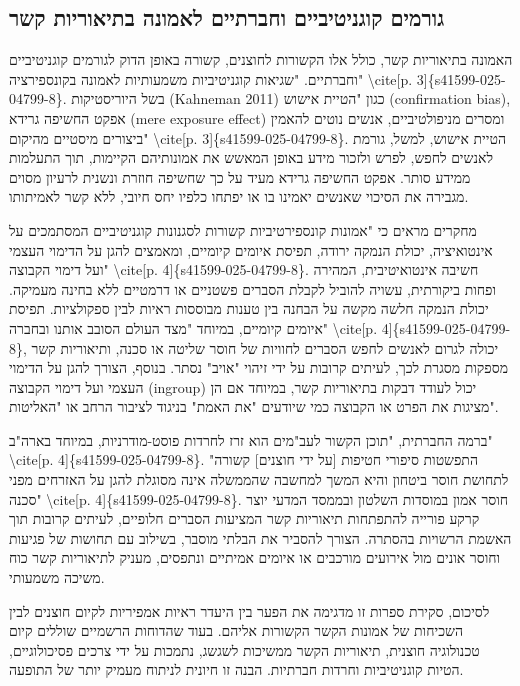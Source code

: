 \documentclass[12pt,a4paper]{article}
\begin{document}
\subsection{גורמים קוגניטיביים וחברתיים לאמונה בתיאוריות קשר}
האמונה בתיאוריות קשר, כולל אלו הקשורות לחוצנים, קשורה באופן הדוק לגורמים קוגניטיביים וחברתיים. "שגיאות קוגניטיביות משמעותיות לאמונה בקונספירציה" \textbackslash{}cite[p. 3]\{s41599-025-04799-8\}. בשל היוריסטיקות (Kahneman 2011) כגון "הטיית אישוש (confirmation bias), אפקט החשיפה גרידא (mere exposure effect) ומסרים מניפולטיביים, אנשים נוטים להאמין ביצורים מיסטיים מהיקום" \textbackslash{}cite[p. 3]\{s41599-025-04799-8\}. הטיית אישוש, למשל, גורמת לאנשים לחפש, לפרש ולזכור מידע באופן המאשש את אמונותיהם הקיימות, תוך התעלמות ממידע סותר. אפקט החשיפה גרידא מעיד על כך שחשיפה חוזרת ונשנית לרעיון מסוים מגבירה את הסיכוי שאנשים יאמינו בו או יפתחו כלפיו יחס חיובי, ללא קשר לאמיתותו.

מחקרים מראים כי "אמונות קונספירטיביות קשורות לסגנונות קוגניטיביים המסתמכים על אינטואיציה, יכולת הנמקה ירודה, תפיסת איומים קיומיים, ומאמצים להגן על הדימוי העצמי ועל דימוי הקבוצה" \textbackslash{}cite[p. 4]\{s41599-025-04799-8\}. חשיבה אינטואיטיבית, המהירה ופחות ביקורתית, עשויה להוביל לקבלת הסברים פשטניים או דרמטיים ללא בחינה מעמיקה. יכולת הנמקה חלשה מקשה על הבחנה בין טענות מבוססות ראיות לבין ספקולציות. תפיסת איומים קיומיים, במיוחד "מצד העולם הסובב אותנו ובחברה" \textbackslash{}cite[p. 4]\{s41599-025-04799-8\}, יכולה לגרום לאנשים לחפש הסברים לחוויות של חוסר שליטה או סכנה, ותיאוריות קשר מספקות מסגרת לכך, לעיתים קרובות על ידי זיהוי "אויב" נסתר. בנוסף, הצורך להגן על הדימוי העצמי ועל דימוי הקבוצה (ingroup) יכול לעודד דבקות בתיאוריות קשר, במיוחד אם הן מציגות את הפרט או הקבוצה כמי שיודעים "את האמת" בניגוד לציבור הרחב או "האליטות".

ברמה החברתית, "תוכן הקשור לעב"מים הוא זרז לחרדות פוסט-מודרניות, במיוחד בארה"ב" \textbackslash{}cite[p. 4]\{s41599-025-04799-8\}. "התפשטות סיפורי חטיפות [על ידי חוצנים] קשורה לתחושת חוסר ביטחון והיא המשך למחשבה שהממשלה אינה מסוגלת להגן על האזרחים מפני סכנה" \textbackslash{}cite[p. 4]\{s41599-025-04799-8\}. חוסר אמון במוסדות השלטון ובממסד המדעי יוצר קרקע פורייה להתפתחות תיאוריות קשר המציעות הסברים חלופיים, לעיתים קרובות תוך האשמת הרשויות בהסתרה. הצורך להסביר את הבלתי מוסבר, בשילוב עם תחושות של פגיעות וחוסר אונים מול אירועים מורכבים או איומים אמיתיים ונתפסים, מעניק לתיאוריות קשר כוח משיכה משמעותי.

לסיכום, סקירת ספרות זו מדגימה את הפער בין היעדר ראיות אמפיריות לקיום חוצנים לבין השכיחות של אמונות הקשר הקשורות אליהם. בעוד שהדוחות הרשמיים שוללים קיום טכנולוגיה חוצנית, תיאוריות הקשר ממשיכות לשגשג, נתמכות על ידי צרכים פסיכולוגיים, הטיות קוגניטיביות וחרדות חברתיות. הבנה זו חיונית לניתוח מעמיק יותר של התופעה.
\end{document}
